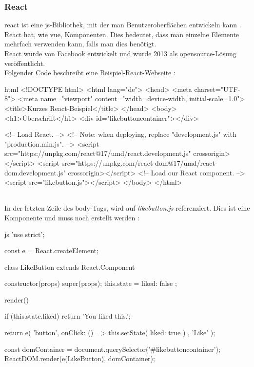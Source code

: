 \subsubsection{React}
\Gls{react} ist eine \Gls{js}-Bibliothek, mit der man Benutzeroberflächen entwickeln kann \cite{reactdoc}. React hat, wie \Gls{vue}, Komponenten. Dies bedeutet, dass man einzelne Elemente mehrfach verwenden kann, falls man dies benötigt.\\
React wurde von Facebook entwickelt und wurde 2013 als \Gls{opensource}-Lösung veröffentlicht.\\
Folgender Code beschreibt eine Beispiel-React-Webseite \cite{reactdoc}:
\begin{code}{html}
	<!DOCTYPE html>
	<html lang="de">
		<head>
			<meta charset="UTF-8">
			<meta name="viewport" content="width=device-width, initial-scale=1.0">
			<title>Kurzes React-Beispiel</title>
		</head>
		<body>
			<h1>Überschrift</h1>
			<div id="likebuttoncontainer"></div>
			
			<!-- Load React. -->
			<!-- Note: when deploying, replace "development.js" with "production.min.js". -->
			<script src="https://unpkg.com/react@17/umd/react.development.js" crossorigin></script>
			<script src="https://unpkg.com/react-dom@17/umd/react-dom.development.js" crossorigin></script>
			<!-- Load our React component. -->
			<script src="likebutton.js"></script>
		</body>
	</html>
\end{code}
~\\
\newpage
In der letzten Zeile des body-Tags, wird auf \textit{likebutton.js} referenziert. Dies ist eine Komponente und muss noch erstellt werden \cite{reactdoc}:
\begin{code}{js}
	'use strict';
	
	const e = React.createElement;
	
	class LikeButton extends React.Component {
		constructor(props) {
			super(props);
			this.state = { liked: false };
		}
		
		render() {
			if (this.state.liked) {
				return 'You liked this.';
			}
			
			return e(
			'button',
			{ onClick: () => this.setState({ liked: true }) },
			'Like'
			);
		}
	}
	
	const domContainer = document.querySelector('#likebuttoncontainer');
	ReactDOM.render(e(LikeButton), domContainer);
\end{code}
\newpage

